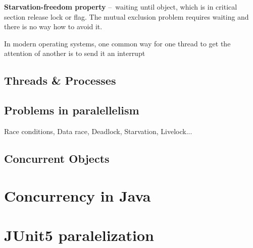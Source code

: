\begin{definition}
  \textbf{Starvation-freedom property} \---\   waiting until object, which is in critical section release lock or flag. The mutual exclusion problem requires waiting and there is no way how to avoid it.     
\end{definition}

In modern operating systems, one common way for one thread to get the attention of another is to send it an interrupt

\subsection{Threads \& Processes}

\subsection{Problems in paralellelism}

Race conditions, Data race, Deadlock, Starvation, Livelock...

\subsection{Concurrent Objects}

\section{Concurrency in Java}
\section{JUnit5 paralelization}